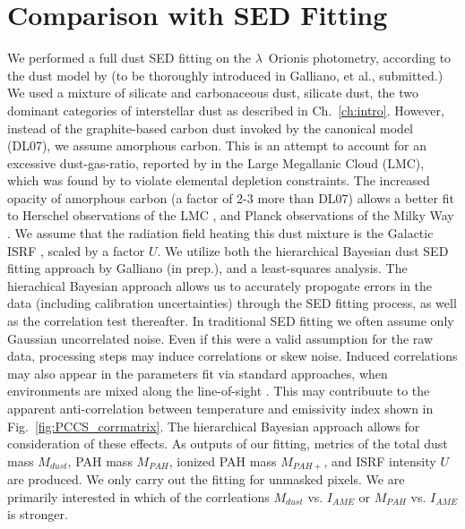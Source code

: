         \section{Comparison with SED Fitting}
          We performed a full dust SED fitting on the $\lambda$~Orionis photometry, according to the dust model by \cite{galliano11} (to be thoroughly introduced in Galliano, et al., submitted.)  We used a mixture of silicate and carbonaceous dust, silicate dust, the two dominant categories of interstellar dust as described in Ch.~\ref{ch:intro}. However, instead of the graphite-based carbon dust invoked by the canonical \cite{draine07} model (DL07), we assume amorphous carbon. This is an attempt to account for an excessive dust-gas-ratio, reported by \cite{israel10, bot10} in the Large Megallanic Cloud (LMC), which was found by \cite{galliano11} to violate elemental depletion constraints. The increased opacity of amorphous carbon (a factor of 2-3 more than DL07) allows a better fit to Herschel observations of the LMC \citep{galliano11}, and Planck observations of the Milky Way \citep{planckIntXXIX16}. We assume that the radiation field heating this dust mixture is the Galactic ISRF \citep{mathis83}, scaled by a factor $U$.
          We utilize both the hierarchical Bayesian dust SED fitting approach by Galliano (in prep.), and a least-squares analysis. The hierachical Bayesian approach allows us to accurately propogate errors in the data (including calibration uncertainties) through the SED fitting process, as well as the correlation test thereafter. In traditional SED fitting we often assume only Gaussian uncorrelated noise. Even if this were a valid assumption for the raw data, processing steps may induce correlations or skew noise. Induced correlations may also appear in the parameters fit via standard approaches, when environments are mixed along the line-of-sight \citep{shetty09}. This may contribuute to the apparent anti-correlation between temperature and emissivity index shown in Fig.~\ref{fig:PCCS_corrmatrix}. The hierarchical Bayesian approach allows for consideration of these effects. As outputs of our fitting, metrics of the total dust mass $M_{dust}$, PAH mass $M_{PAH}$, ionized PAH mass $M_{PAH+}$, and ISRF intensity $U$ are produced. We only carry out the fitting for unmasked pixels. We are primarily interested in which of the corrleations $M_{dust}$ vs. $I_{AME}$ or $M_{PAH}$ vs. $I_{AME}$ is stronger.
